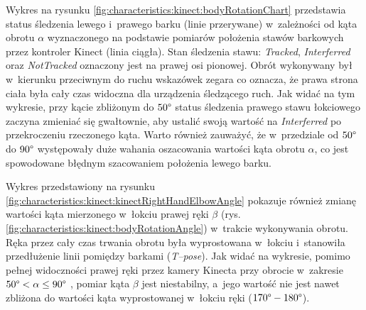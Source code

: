 Wykres na rysunku \ref{fig:characteristics:kinect:bodyRotationChart} przedstawia status śledzenia lewego i~prawego barku (linie przerywane) w~zależności od kąta obrotu $\alpha$ wyznaczonego na podstawie pomiarów położenia stawów barkowych przez kontroler Kinect (linia ciągła). Stan śledzenia stawu: \emph{Tracked}, \emph{Interferred} oraz \emph{NotTracked} oznaczony jest na prawej osi pionowej. Obrót wykonywany był w~kierunku przeciwnym do ruchu wskazówek zegara co oznacza, że prawa strona ciała była cały czas widoczna dla urządzenia śledzącego ruch. Jak widać na tym wykresie, przy kącie zbliżonym do $50\degree$ status śledzenia prawego stawu łokciowego zaczyna zmieniać się gwałtownie, aby ustalić swoją wartość na \emph{Interferred} po przekroczeniu rzeczonego kąta. Warto również zauważyć, że w~przedziale od $50\degree$ do $90\degree$ występowały duże wahania oszacowania wartości kąta obrotu $\alpha$, co jest spowodowane błędnym szacowaniem położenia lewego barku.

Wykres przedstawiony na rysunku \ref{fig:characteristics:kinect:kinectRightHandElbowAngle} pokazuje również zmianę wartości kąta mierzonego w~łokciu prawej ręki $\beta$ (rys. \ref{fig:characteristics:kinect:bodyRotationAngle}) w~trakcie wykonywania obrotu. Ręka przez cały czas trwania obrotu była wyprostowana w~łokciu i~stanowiła przedłużenie linii pomiędzy barkami (\emph{T--pose}). Jak widać na wykresie, pomimo pełnej widoczności prawej ręki przez kamery Kinecta przy obrocie w~zakresie  $50\degree < \alpha \le 90\degree$ , pomiar kąta $\beta$ jest niestabilny, a~jego wartość nie jest nawet zbliżona do wartości kąta wyprostowanej w~łokciu ręki ($170\degree-180\degree$). 
																																							
